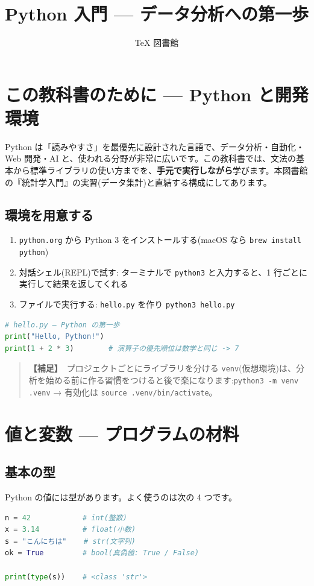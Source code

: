 \documentclass{article}
\title{Python 入門 — データ分析への第一歩}
\author{TeX 図書館}
\begin{document}
\section{この教科書のために — Python と開発環境}

Python は「読みやすさ」を最優先に設計された言語で、データ分析・自動化・Web 開発・AI と、使われる分野が非常に広いです。この教科書では、文法の基本から標準ライブラリの使い方までを、\textbf{手元で実行しながら}学びます。本図書館の『統計学入門』の実習(データ集計)と直結する構成にしてあります。

\subsection{環境を用意する}

\begin{enumerate}
\item \texttt{python.org} から Python 3 をインストールする(macOS なら \texttt{brew install python})
\item 対話シェル(REPL)で試す: ターミナルで \texttt{python3} と入力すると、1 行ごとに実行して結果を返してくれる
\item ファイルで実行する: \texttt{hello.py} を作り \texttt{python3 hello.py}
\end{enumerate}

\begin{lstlisting}[language=Python]
# hello.py — Python の第一歩
print("Hello, Python!")
print(1 + 2 * 3)        # 演算子の優先順位は数学と同じ -> 7
\end{lstlisting}

\begin{quote}
\textbf{【補足】}\ プロジェクトごとにライブラリを分ける \texttt{venv}(仮想環境)は、分析を始める前に作る習慣をつけると後で楽になります:\texttt{python3 -m venv .venv} → 有効化は \texttt{source .venv/bin/activate}。
\end{quote}

\section{値と変数 — プログラムの材料}

\subsection{基本の型}

Python の値には型があります。よく使うのは次の 4 つです。

\begin{lstlisting}[language=Python]
n = 42            # int(整数)
x = 3.14          # float(小数)
s = "こんにちは"    # str(文字列)
ok = True         # bool(真偽値: True / False)

print(type(s))    # <class 'str'>
\end{lstlisting}
\end{document}
